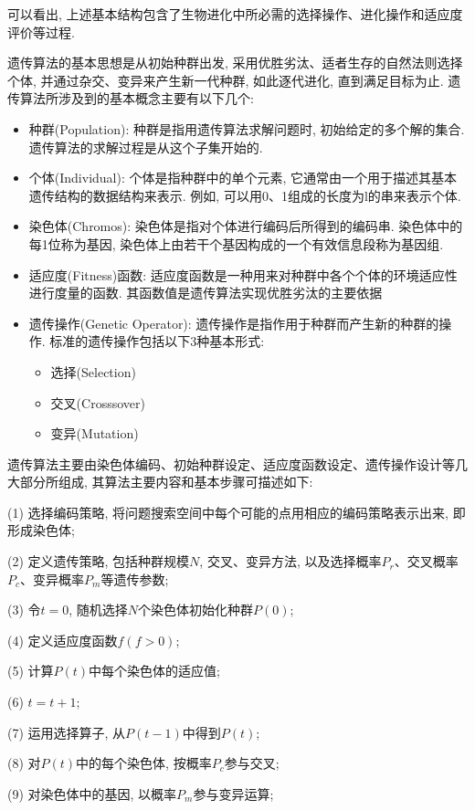 可以看出, 上述基本结构包含了生物进化中所必需的选择操作、进化操作和适应度评价等过程.

遗传算法的基本思想是从初始种群出发, 采用优胜劣汰、适者生存的自然法则选择个体, 并通过杂交、变异来产生新一代种群, 如此逐代进化, 直到满足目标为止.
遗传算法所涉及到的基本概念主要有以下几个:
\begin{itemize}
\item 种群(Population): 种群是指用遗传算法求解问题时, 初始给定的多个解的集合. 遗传算法的求解过程是从这个子集开始的.
\item 个体(Individual): 个体是指种群中的单个元素, 它通常由一个用于描述其基本遗传结构的数据结构来表示. 例如, 可以用0、1组成的长度为l的串来表示个体.
\item 染色体(Chromos): 染色体是指对个体进行编码后所得到的编码串. 染色体中的每1位称为基因, 染色体上由若干个基因构成的一个有效信息段称为基因组.
\item 适应度(Fitness)函数: 适应度函数是一种用来对种群中各个个体的环境适应性进行度量的函数. 其函数值是遗传算法实现优胜劣汰的主要依据
\item 遗传操作(Genetic Operator): 遗传操作是指作用于种群而产生新的种群的操作. 标准的遗传操作包括以下3种基本形式:
\begin{itemize}
    \item 选择(Selection)
    \item 交叉(Crosssover)
    \item 变异(Mutation)
\end{itemize}
\end{itemize}

遗传算法主要由染色体编码、初始种群设定、适应度函数设定、遗传操作设计等几大部分所组成, 其算法主要内容和基本步骤可描述如下:

(1) 选择编码策略, 将问题搜索空间中每个可能的点用相应的编码策略表示出来, 即形成染色体;

(2) 定义遗传策略, 包括种群规模$N$, 交叉、变异方法, 以及选择概率$P_r$、交叉概率$P_c$、变异概率$P_m$等遗传参数;

(3) 令$t=0$, 随机选择$N$个染色体初始化种群$P(0)$;

(4) 定义适应度函数$f(f>0)$;

(5) 计算$P(t)$中每个染色体的适应值;

(6) $t=t+1$;

(7) 运用选择算子, 从$P(t-1)$中得到$P(t)$;

(8) 对$P(t)$中的每个染色体, 按概率$P_c$参与交叉;

(9) 对染色体中的基因, 以概率$P_m$参与变异运算;

